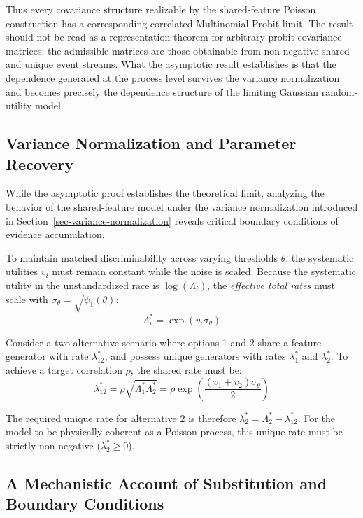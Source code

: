 \documentclass[
  man,
  floatsintext,
  longtable,
  a4paper,
  nolmodern,
  notxfonts,
  notimes,
  colorlinks=true,linkcolor=blue,citecolor=blue,urlcolor=blue]{apa7}
\begin{document}
Thus every covariance structure realizable by the shared-feature Poisson
construction has a corresponding correlated Multinomial Probit limit.
The result should not be read as a representation theorem for arbitrary
probit covariance matrices: the admissible matrices are those obtainable
from non-negative shared and unique event streams. What the asymptotic
result establishes is that the dependence generated at the process level
survives the variance normalization and becomes precisely the dependence
structure of the limiting Gaussian random-utility model.

\subsection{Variance Normalization and Parameter
Recovery}\label{variance-normalization-and-parameter-recovery}

While the asymptotic proof establishes the theoretical limit, analyzing
the behavior of the shared-feature model under the variance
normalization introduced in Section~\ref{sec-variance-normalization}
reveals critical boundary conditions of evidence accumulation.

To maintain matched discriminability across varying thresholds
\(\theta\), the systematic utilities \(v_i\) must remain constant while
the noise is scaled. Because the systematic utility in the
unstandardized race is \(\log(\Lambda_i)\), the \emph{effective total
rates} must scale with \(\sigma_\theta = \sqrt{\psi_1(\theta)}\): \[
\Lambda_i^* = \exp(v_i \sigma_\theta)
\]

Consider a two-alternative scenario where options 1 and 2 share a
feature generator with rate \(\lambda_{12}^*\), and possess unique
generators with rates \(\lambda_1^*\) and \(\lambda_2^*\). To achieve a
target correlation \(\rho\), the shared rate must be: \[
\lambda_{12}^* = \rho \sqrt{\Lambda_1^* \Lambda_2^*} = \rho \exp\left(\frac{(v_1 + v_2) \sigma_\theta}{2}\right)
\]

The required unique rate for alternative 2 is therefore
\(\lambda_2^* = \Lambda_2^* - \lambda_{12}^*\). For the model to be
physically coherent as a Poisson process, this unique rate must be
strictly non-negative (\(\lambda_2^* \ge 0\)).

\subsection{A Mechanistic Account of Substitution and Boundary
Conditions}\label{a-mechanistic-account-of-substitution-and-boundary-conditions}
\end{document}
